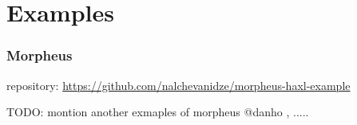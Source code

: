 \section{Examples}

\begin{frame}\frametitle{Morpheus}

repository: \url{https://github.com/nalchevanidze/morpheus-haxl-example}

TODO: montion another exmaples of morpheus @danho , .....

\end{frame}